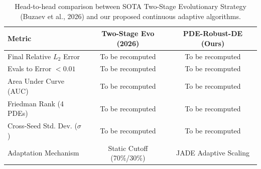 \begin{table}[htbp]
\centering
\caption{Head-to-head comparison between SOTA Two-Stage Evolutionary Strategy (Buzaev et al., 2026) and our proposed continuous adaptive algorithms.}
\label{tab:baseline_head_to_head}
\small
\begin{tabular}{lcc}
\toprule
\textbf{Metric} & \textbf{Two-Stage Evo (2026)} & \textbf{PDE-Robust-DE (Ours)} \\
\midrule
Final Relative $L_2$ Error & To be recomputed & To be recomputed \\
Evals to Error $< 0.01$ & To be recomputed & To be recomputed \\
Area Under Curve (AUC) & To be recomputed & To be recomputed \\
Friedman Rank (4 PDEs) & To be recomputed & To be recomputed \\
Cross-Seed Std. Dev. ($\sigma$) & To be recomputed & To be recomputed \\
Adaptation Mechanism & Static Cutoff (70\%/30\%) & JADE Adaptive Scaling \\
\bottomrule
\end{tabular}
\end{table}

